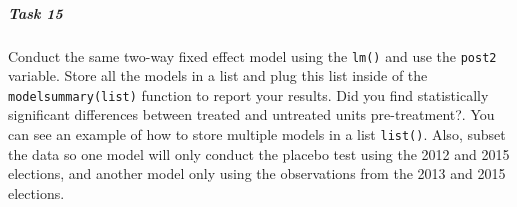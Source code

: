 \documentclass[
]{article}
\begin{document}
\subparagraph{Task 15}\label{task-15}

Conduct the same two-way fixed effect model using the \texttt{lm()} and
use the \texttt{post2} variable. Store all the models in a list and plug
this list inside of the \texttt{modelsummary(list)} function to report
your results. Did you find statistically significant differences between
treated and untreated units pre-treatment?. You can see an example of
how to store multiple models in a list \texttt{list()}. Also, subset the
data so one model will only conduct the placebo test using the 2012 and
2015 elections, and another model only using the observations from the
2013 and 2015 elections.
\end{document}
